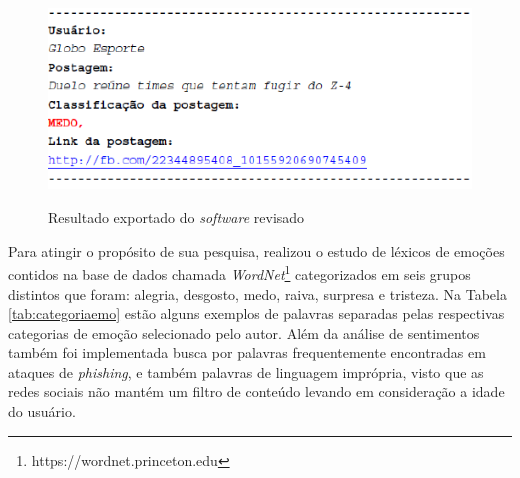 \begin{figure}[!h]
\centering 
\caption{Resultado exportado do \textit{software} revisado}
\includegraphics[scale=0.60]{imagens/exportadofilipe.png}
\label{fig:exportadotccfilipe}
\end{figure}

\newpage
Para atingir o propósito de sua pesquisa, \citeauthor{tccfilipe} realizou o estudo de léxicos de emoções contidos na base de dados chamada \textit{WordNet}\footnote{https://wordnet.princeton.edu} categorizados em seis grupos distintos que foram: alegria, desgosto, medo, raiva, surpresa e tristeza. Na Tabela \ref{tab:categoriaemo} estão alguns exemplos de palavras separadas pelas respectivas categorias de emoção selecionado pelo autor. Além da análise de sentimentos também foi implementada busca por palavras frequentemente encontradas em ataques de \textit{phishing},  e também palavras de linguagem imprópria, visto que as redes sociais não mantém um filtro de conteúdo levando em consideração a idade do usuário.

